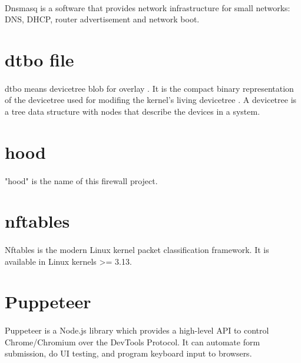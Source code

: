 \documentclass[mscthesis]{usiinfthesis}
\begin{document}
\paragraph{}
Dnsmasq is a software that provides network infrastructure for small networks: DNS, DHCP, router advertisement and network boot.

\section{dtbo file}\label{sec:dtbo}
\paragraph{}
dtbo means devicetree blob for overlay \citep{dtbo:android}. It is the compact binary representation of the devicetree used for modifing the kernel's living devicetree \citep{dtbo:kernel}. A devicetree is a tree data structure with nodes that describe the devices in a system. \citep{dtbo:spec}

\section{hood}\label{sec:hood}
\paragraph{}
"hood" is the name of this firewall project.

\section{nftables}\label{sec:nftables}
\paragraph{}
Nftables is the modern Linux kernel packet classification framework. It is available in Linux kernels >= 3.13.

\section{Puppeteer}\label{sec:Puppeteer}
\paragraph{}
Puppeteer is a Node.js library which provides a high-level API to control Chrome/Chromium over the DevTools Protocol. It can automate form submission, do UI testing, and program keyboard input to browsers.
\end{document}
